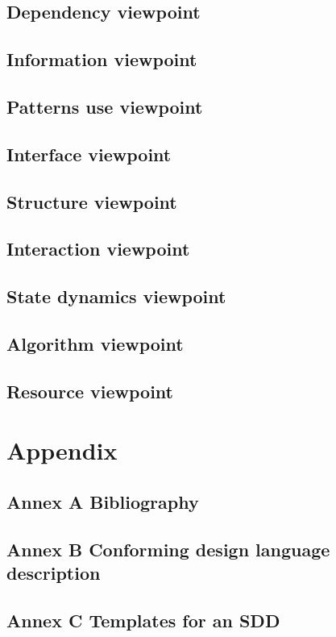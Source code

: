 \documentclass[compsoc,draftclsnofoot,onecolumn,10pt]{IEEEtran}
\begin{document}
\subsection{Dependency viewpoint} 
\subsection{Information viewpoint} 
\subsection{Patterns use viewpoint} 
\subsection{Interface viewpoint} 
\subsection{Structure viewpoint} 
\subsection{Interaction viewpoint} 
\subsection{State dynamics viewpoint} 
\subsection{Algorithm viewpoint} 
\subsection{Resource viewpoint}

\section{Appendix}
\subsection{Annex A  Bibliography} 



\subsection{Annex B  Conforming design language description} 
\subsection{Annex C Templates for an SDD}
\end{document}
